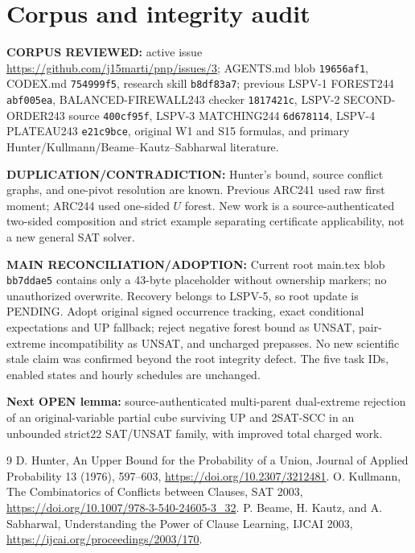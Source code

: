 \documentclass[10pt]{article}
\begin{document}
\section{Corpus and integrity audit}
\textbf{CORPUS REVIEWED:} active issue \url{https://github.com/j15marti/pnp/issues/3}; AGENTS.md blob \texttt{19656af1}, CODEX.md \texttt{754999f5}, research skill \texttt{b8df83a7}; previous LSPV-1 FOREST244 \texttt{abf005ea}, BALANCED-FIREWALL243 checker \texttt{1817421c}, LSPV-2 SECOND-ORDER243 source \texttt{400cf95f}, LSPV-3 MATCHING244 \texttt{6d678114}, LSPV-4 PLATEAU243 \texttt{e21c9bce}, original W1 and S15 formulas, and primary Hunter/Kullmann/Beame--Kautz--Sabharwal literature.
\par\noindent\textbf{DUPLICATION/CONTRADICTION:} Hunter's bound, source conflict graphs, and one-pivot resolution are known. Previous ARC241 used raw first moment; ARC244 used one-sided $U$ forest. New work is a source-authenticated two-sided composition and strict example separating certificate applicability, not a new general SAT solver.
\par\noindent\textbf{MAIN RECONCILIATION/ADOPTION:} Current root main.tex blob \texttt{bb7ddae5} contains only a 43-byte placeholder without ownership markers; no unauthorized overwrite. Recovery belongs to LSPV-5, so root update is PENDING. Adopt original signed occurrence tracking, exact conditional expectations and UP fallback; reject negative forest bound as UNSAT, pair-extreme incompatibility as UNSAT, and uncharged prepasses. No new scientific stale claim was confirmed beyond the root integrity defect. The five task IDs, enabled states and hourly schedules are unchanged.
\par\noindent\textbf{Next OPEN lemma:} source-authenticated multi-parent dual-extreme rejection of an original-variable partial cube surviving UP and 2SAT-SCC in an unbounded strict22 SAT/UNSAT family, with improved total charged work.
\begin{thebibliography}{9}
 D. Hunter, An Upper Bound for the Probability of a Union, Journal of Applied Probability 13 (1976), 597--603, \url{https://doi.org/10.2307/3212481}.
 O. Kullmann, The Combinatorics of Conflicts between Clauses, SAT 2003, \url{https://doi.org/10.1007/978-3-540-24605-3_32}.
 P. Beame, H. Kautz, and A. Sabharwal, Understanding the Power of Clause Learning, IJCAI 2003, \url{https://ijcai.org/proceedings/2003/170}.
\end{thebibliography}
\end{document}
